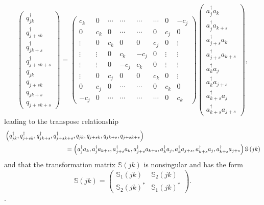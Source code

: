 \documentclass{preprint}
\begin{document}
\begin{equation}
\left(
\begin{array}{c}
q_{jk}^{\dagger } \\
q_{j+sk}^{\dagger } \\
q_{jk+s}^{\dagger } \\
q_{j+sk+s}^{\dagger } \\
q_{jk} \\
q_{j+sk} \\
q_{jk+s} \\
q_{j+sk+s}%
\end{array}%
\right) =\left(
\begin{array}{cccccccc}
c_{k} & 0 & \cdots & \cdots & \cdots & \cdots & 0 & -c_{j} \\
0 & c_{k} & 0 & \cdots & \cdots & 0 & c_{j} & 0 \\
\vdots & 0 & c_{k} & 0 & 0 & c_{j} & 0 & \vdots \\
\vdots & \vdots & 0 & c_{k} & -c_{j} & 0 & \vdots & \vdots \\
\vdots & \vdots & 0 & -c_{j} & c_{k} & 0 & \vdots & \vdots \\
\vdots & 0 & c_{j} & 0 & 0 & c_{k} & 0 & \vdots \\
0 & c_{j} & 0 & \cdots & \cdots & 0 & c_{k} & 0 \\
-c_{j} & 0 & \cdots & \cdots & \cdots & \cdots & 0 & c_{k}%
\end{array}%
\right) \left(
\begin{array}{c}
a_{j}^{\dagger }a_{k} \\
a_{j}^{\dagger }a_{k+s} \\
a_{j+s}^{\dagger }a_{k} \\
a_{j+s}^{\dagger }a_{k+s} \\
a_{k}^{\dagger }a_{j} \\
a_{k}^{\dagger }a_{j+s} \\
a_{k+s}^{\dagger }a_{j} \\
a_{k+s}^{\dagger }a_{j+s}%
\end{array}%
\right) ,
\end{equation}%
leading to the transpose relationship
\begin{align}
& \left( q_{jk}^{\dagger },q_{j+sk}^{\dagger },q_{jk+s}^{\dagger
},q_{j+sk+s}^{\dagger },q_{jk},q_{j+sk},q_{jk+s},q_{j+sk+s}\right)  \notag \\
& \qquad \qquad \qquad \qquad \qquad \left. =\right. \left( a_{j}^{\dagger
}a_{k},a_{j}^{\dagger }a_{k+s},a_{j+s}^{\dagger }a_{k},a_{j+s}^{\dagger
}a_{k+s},a_{k}^{\dagger }a_{j},a_{k}^{\dagger }a_{j+s},a_{k+s}^{\dagger
}a_{j},a_{k+s}^{\dagger }a_{j+s}\right) \mathbb{S}\left( jk\right)
\end{align}%
and that the transformation matrix $\mathbb{S}\left( jk\right) $ is
nonsingular and has the form
\begin{equation}
\mathbb{S}\left( jk\right) =\left(
\begin{array}{cc}
\mathbb{S}_{1}\left( jk\right) & \mathbb{S}_{2}\left( jk\right) \\
\mathbb{S}_{2}\left( jk\right) ^{\ast } & \mathbb{S}_{1}\left( jk\right)
^{\ast }%
\end{array}%
\right) .
\end{equation}%
.
\end{document}
